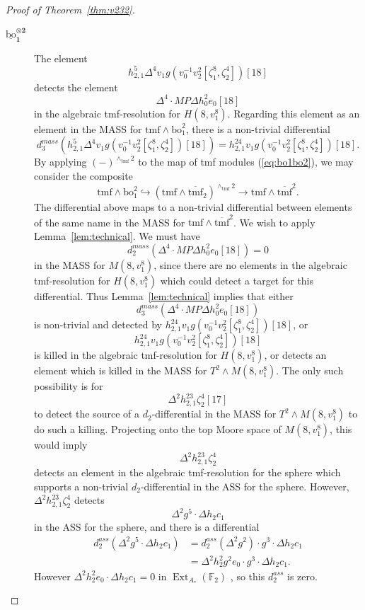 \documentclass[10pt]{amsart}
\newcommand{\ul}[1]{\underline{#1}}
\newcommand{\br}[1]{\overline{#1}}
\newcommand{\FF}{\mathbb{F}}
\newcommand{\tmf}{\mathrm{tmf}}
\newcommand{\bo}{\mathrm{bo}}
\newcommand{\bou}{\ul{\bo}}
\theoremstyle{definition}
\numberwithin{equation}{section}
\numberwithin{figure}{section}
\DeclareMathOperator{\Ext}{Ext}
\begin{document}
\begin{proof}[Proof of Theorem~\ref{thm:v232}]
\begin{description}
\item[$\pmb{\bou_1^{\otimes 2}}$] 
The element
$$ h_{2,1}^5\Delta^4 v_1 g(v_0^{-1}v_2^2[\zeta_1^8,\zeta_2^4])[18] $$
detects the element 
$$ \Delta^4 \cdot MP\Delta h_0^2e_0[18] $$
in the algebraic tmf-resolution for $H(8,v_1^8)$. 
Regarding this element as an element in the MASS for $\tmf \wedge \bo_1^2$, there is a non-trivial differential
$$ d^{mass}_3(h_{2,1}^5\Delta^4 v_1 g(v_0^{-1}v_2^2[\zeta_1^8,\zeta_2^4])[18]) = h^{24}_{2,1}v_1 g(v_0^{-1}v_2^2[\zeta_1^8,\zeta_2^4])[18]. $$
By applying $(-)^{\wedge_\tmf 2}$ to the map of tmf modules (\ref{eq:bo1bo2}),
we may consider the composite
\begin{equation}\label{eq:bo1^2map}
\tmf \wedge \bo_1^2 \hookrightarrow (\tmf \wedge \br{\tmf}_2)^{\wedge_\tmf 2}
\rightarrow \tmf \wedge \br{\tmf}^2. 
\end{equation}
The differential above maps to a non-trivial differential between elements of the same name in the MASS for $\tmf \wedge \br{\tmf}^2$.  We wish to apply Lemma~\ref{lem:technical}.  We must have 
$$ d^{mass}_2(\Delta^4 \cdot MP\Delta h_0^2e_0[18]) = 0 $$
in the MASS for $M(8,v_1^8)$, since there are no elements in the algebraic tmf-resolution for $H(8,v_1^8)$ which could detect a target for this differential.  Thus Lemma~\ref{lem:technical} implies that either
$$ d_3^{mass}(\Delta^4 \cdot MP\Delta h_0^2e_0[18]) $$
is non-trivial and detected by $h^{24}_{2,1}v_1 g(v_0^{-1}v_2^2[\zeta_1^8,\zeta_2^4])[18]$, or 
$$ h^{24}_{2,1}v_1 g(v_0^{-1}v_2^2[\zeta_1^8,\zeta_2^4])[18] $$
is killed in the algebraic tmf-resolution for $H(8,v_1^8)$, or detects an element which is killed in the MASS for $T^2 \wedge M(8,v_1^8)$.  The only such possibility is for 
$$ \Delta^2 h_{2,1}^{23} \zeta_2^4[17] $$
to detect the source of a $d_2$-differential in the MASS for $T^2 \wedge M(8,v_1^8)$ to do such a killing.
Projecting onto the top Moore space of $M(8,v_1^8)$, this would imply 
$$ \Delta^2 h_{2,1}^{23} \zeta_2^4 $$
detects an element in the algebraic tmf-resolution for the sphere which supports a non-trivial $d_2$-differential in the ASS for the sphere.  However, 
$\Delta^2 h_{2,1}^{23} \zeta_2^4$
detects
$$ \Delta^2 g^5 \cdot \Delta h_2 c_1 $$
in the ASS for the sphere, and there is a differential
\begin{align*}
d_2^{ass}(\Delta^2 g^5 \cdot \Delta h_2 c_1) 
& = d_2^{ass}(\Delta^2 g^2) \cdot g^3 \cdot \Delta h_2 c_1 \\
& = \Delta^2 h_2^2 g^2 e_0 \cdot g^3 \cdot \Delta h_2 c_1.
\end{align*}
However $\Delta^2 h_2^2 e_0 \cdot \Delta h_2 c_1 = 0$ in $\Ext_{A_*}(\FF_2)$ \cite{Bruner}, so this $d_2^{ass}$ is zero.

\end{description}
\end{proof}
\end{document}
